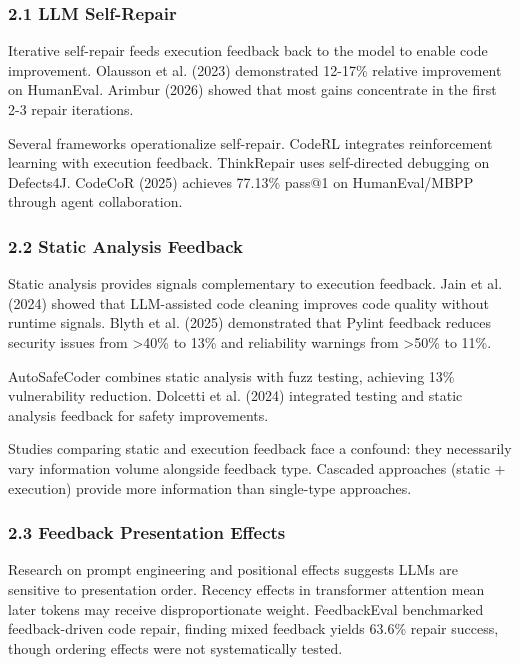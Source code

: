 
\subsubsection{2.1 LLM Self-Repair}

Iterative self-repair feeds execution feedback back to the model to enable code improvement. Olausson et al. (2023) demonstrated 12-17\% relative improvement on HumanEval. Arimbur (2026) showed that most gains concentrate in the first 2-3 repair iterations.

Several frameworks operationalize self-repair. CodeRL integrates reinforcement learning with execution feedback. ThinkRepair uses self-directed debugging on Defects4J. CodeCoR (2025) achieves 77.13\% pass@1 on HumanEval/MBPP through agent collaboration.

\subsubsection{2.2 Static Analysis Feedback}

Static analysis provides signals complementary to execution feedback. Jain et al. (2024) showed that LLM-assisted code cleaning improves code quality without runtime signals. Blyth et al. (2025) demonstrated that Pylint feedback reduces security issues from >40\% to 13\% and reliability warnings from >50\% to 11\%.

AutoSafeCoder combines static analysis with fuzz testing, achieving 13\% vulnerability reduction. Dolcetti et al. (2024) integrated testing and static analysis feedback for safety improvements.

Studies comparing static and execution feedback face a confound: they necessarily vary information volume alongside feedback type. Cascaded approaches (static + execution) provide more information than single-type approaches.

\subsubsection{2.3 Feedback Presentation Effects}

Research on prompt engineering and positional effects suggests LLMs are sensitive to presentation order. Recency effects in transformer attention mean later tokens may receive disproportionate weight. FeedbackEval benchmarked feedback-driven code repair, finding mixed feedback yields 63.6\% repair success, though ordering effects were not systematically tested.


